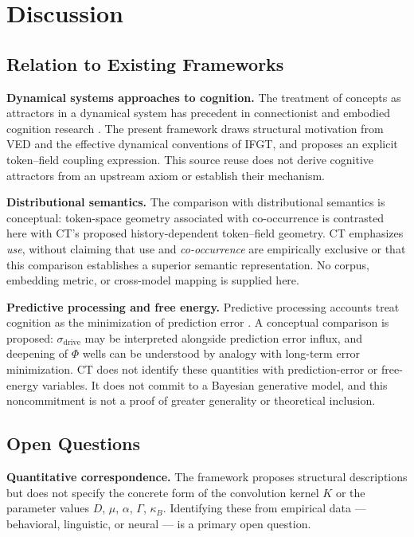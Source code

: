 
\section{Discussion}
\label{sec:discussion}

\subsection{Relation to Existing Frameworks}

\textbf{Dynamical systems approaches to cognition.}
The treatment of concepts as attractors in a dynamical system has
precedent in connectionist and embodied cognition research
\citep[e.g.,][]{thelen1994dynamic}.
The present framework draws structural motivation from VED and the
effective dynamical conventions of IFGT, and proposes an explicit
token--field coupling expression. This source reuse does not derive
cognitive attractors from an upstream axiom or establish their mechanism.

\textbf{Distributional semantics.}
The comparison with distributional semantics is conceptual: token-space
geometry associated with co-occurrence is contrasted here with CT's
proposed history-dependent token--field geometry.
CT emphasizes \emph{use}, without claiming that use and
\emph{co-occurrence} are empirically exclusive or that this comparison
establishes a superior semantic representation.
No corpus, embedding metric, or cross-model mapping is supplied here.

\textbf{Predictive processing and free energy.}
Predictive processing accounts treat cognition as the minimization
of prediction error \citep{friston2010free}.
A conceptual comparison is proposed: $\sigma_{\mathrm{drive}}$
may be interpreted alongside prediction error influx, and deepening of
$\Phi$ wells can be understood by analogy with long-term error minimization.
CT does not identify these quantities with prediction-error or free-energy
variables. It does not commit to a Bayesian generative model, and this
noncommitment is not a proof of greater generality or theoretical inclusion.

\subsection{Open Questions}

\textbf{Quantitative correspondence.}
The framework proposes structural descriptions but does not specify
the concrete form of the convolution kernel $K$ or the parameter
values $D$, $\mu$, $\alpha$, $\Gamma$, $\kappa_B$.
Identifying these from empirical data --- behavioral, linguistic,
or neural --- is a primary open question.

